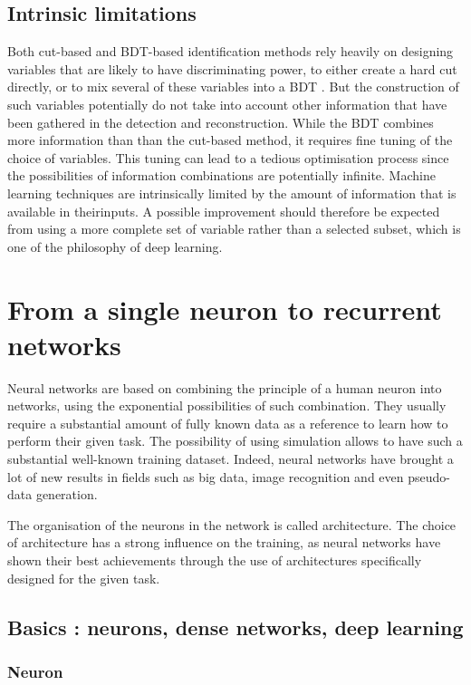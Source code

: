 \subsection{Intrinsic limitations}

Both cut-based and BDT-based identification methods rely heavily on designing variables that are likely to have discriminating power, to either create a hard cut directly, or to mix several of these variables into a BDT . But the construction of such variables potentially do not take into account other information that have been gathered in the detection and reconstruction.
While the BDT combines more information than than the cut-based method, it requires fine tuning of the choice of variables. This tuning can lead to a tedious optimisation process since the possibilities of information combinations are potentially infinite. Machine learning techniques are intrinsically limited by the amount of information that is available in theirinputs. 
A possible improvement should therefore be expected from using a more complete set of variable rather than a selected subset, which is one of the philosophy of deep learning.


\section{From a single neuron to recurrent networks}
\label{sec:NN}
Neural networks are based on combining the principle of a human neuron into networks, using the exponential possibilities of such combination.
They usually require a substantial amount of fully known data as a reference to learn how to perform their given task. The possibility of using simulation allows to have such a substantial  well-known training dataset.
Indeed, neural networks have brought a lot of new results in fields such as big data, image recognition and even pseudo-data generation.

The organisation of the neurons in the network is called architecture. The choice of architecture has a strong influence on the training, as neural networks have shown their best achievements through the use of architectures specifically designed for the given task.

\subsection{Basics : neurons, dense networks, deep learning}

\subsubsection{Neuron}


